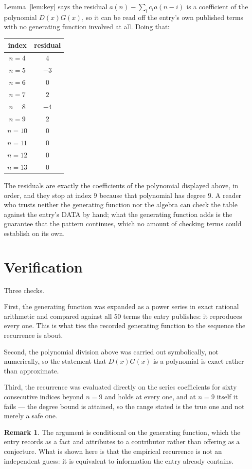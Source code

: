 \documentclass[11pt,a4paper]{article}
\theoremstyle{plain}
\theoremstyle{definition}
\newtheorem{remark}[theorem]{Remark}
\begin{document}
Lemma~\ref{lem:key} says the residual $a(n)-\sum_ic_ia(n-i)$ is a coefficient of the
polynomial $D(x)G(x)$, so it can be read off the entry's own published terms with no
generating function involved at all. Doing that:
\begin{center}
\begin{tabular}{cc}
index & residual \\ \hline
$n=4$ & $4$ \\
$n=5$ & $-3$ \\
$n=6$ & $0$ \\
$n=7$ & $2$ \\
$n=8$ & $-4$ \\
$n=9$ & $2$ \\
$n=10$ & $0$ \\
$n=11$ & $0$ \\
$n=12$ & $0$ \\
$n=13$ & $0$
\end{tabular}
\end{center}
The residuals are exactly the coefficients of the polynomial displayed above, in order, and
they stop at index $9$ because that polynomial has degree $9$. A reader who trusts
neither the generating function nor the algebra can check the table against the entry's DATA
by hand; what the generating function adds is the guarantee that the pattern continues, which
no amount of checking terms could establish on its own.

\section{Verification}

Three checks.

First, the generating function was expanded as a power series in exact rational arithmetic and
compared against all $50$ terms the entry publishes: it reproduces every one. This is
what ties the recorded generating function to the sequence the recurrence is about.

Second, the polynomial division above was carried out symbolically, not numerically, so the
statement that $D(x)G(x)$ is a polynomial is exact rather than approximate.

Third, the recurrence was evaluated directly on the series coefficients for sixty consecutive
indices beyond $n=9$ and holds at every one, and at $n=9$ itself it fails --- the
degree bound is attained, so the range stated is the true one and not merely a safe one.

\begin{remark}
The argument is conditional on the generating function, which the entry records as a fact and
attributes to a contributor rather than offering as a conjecture. What is shown here is that
the empirical recurrence is not an independent guess: it is equivalent to information the
entry already contains.
\end{remark}
\end{document}
